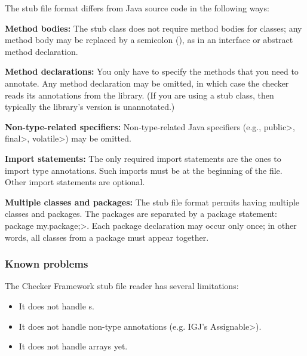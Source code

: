 The stub file format differs from Java source code in the following
ways:
\begin{description}

\item{\textbf{Method bodies:}}
  The stub class does not require method bodies for classes; any method
  body may be replaced by a semicolon (\code{;}), as in an interface or
  abstract method declaration.

\item{\textbf{Method declarations:}}
  You only have to specify the methods that you need to annotate.
  Any method declaration may be omitted, in which case the checker reads
  its annotations from the library.  (If you are using a stub class, then
  typically the library's version is unannotated.)

\item{\textbf{Non-type-related specifiers:}}
  Non-type-related Java specifiers (e.g., \<public>, \<final>, \<volatile>)
  may be omitted.

\item{\textbf{Import statements:}}
  The only required import statements are the ones to import type
  annotations.  Such imports must be at the beginning of the
  file.  Other import statements are optional.

\item{\textbf{Multiple classes and packages:}}
  The stub file format permits having multiple classes and packages.
  The packages are separated by a package statement:
  \<package my.package;>.  Each package declaration may occur only once; in
  other words, all classes from a package must appear together.

\end{description}


\subsubsection{Known problems}


The Checker Framework stub file reader has several limitations:

\begin{itemize}
\item
  It does not handle s.
\item
  It does not handle non-type annotations (e.g. IGJ's \<Assignable>).
\item
  It does not handle arrays yet.
\end{itemize}


